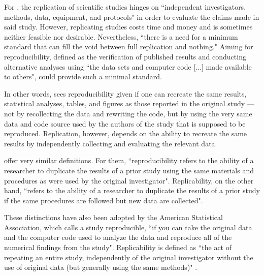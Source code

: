 \documentclass[11pt, a4paper,twoside]{report}\usepackage[]{graphicx}\usepackage[]{color}
\begin{document}
For \cite{peng_reproducible_2009}, the replication of scientific studies hinges on ``independent investigators, methods, data, equipment, and protocols" in order to evaluate the claims made in said study. However, replicating studies costs time and money and is sometimes neither feasible nor desirable. Nevertheless, ``there is a need for a minimum standard that can fill the void between full replication and nothing." Aiming for reproducibility, defined as the verification of published results and conducting alternative analyses using ``the data sets and computer code [$\dots$] made available to others", could provide such a minimal standard. 

In other words, \cite{peng_reproducible_2009} sees reproducibility given if one can recreate the same results, statistical analyses, tables, and figures as those reported in the original study --- not by recollecting the data and rewriting the code, but by using the very same data and code source used by the authors of the study that is supposed to be reproduced. Replication, however, depends on the ability to recreate the same results by independently collecting and evaluating the relevant data.

\cite{cacioppo_social_2015} offer very similar definitions. For them, ``reproducibility refers to the ability of a researcher to duplicate the results of a prior study using the same materials and procedures as were used by the original investigator". Replicability, on the other hand, ``refers to the ability of a researcher to duplicate the results of a prior study if the same procedures are followed but new data are collected".

These distinctions have also been adopted by the American Statistical Association, which calls a study reproducible, ``if you can take the original data and the computer code used to analyze the data and reproduce all of the numerical findings from the study". Replicability is defined as ``the act of repeating an entire study, independently of the original investigator without the use of original data (but generally using the same methods)" \citep{broman_recommendation_2017}.
\end{document}
